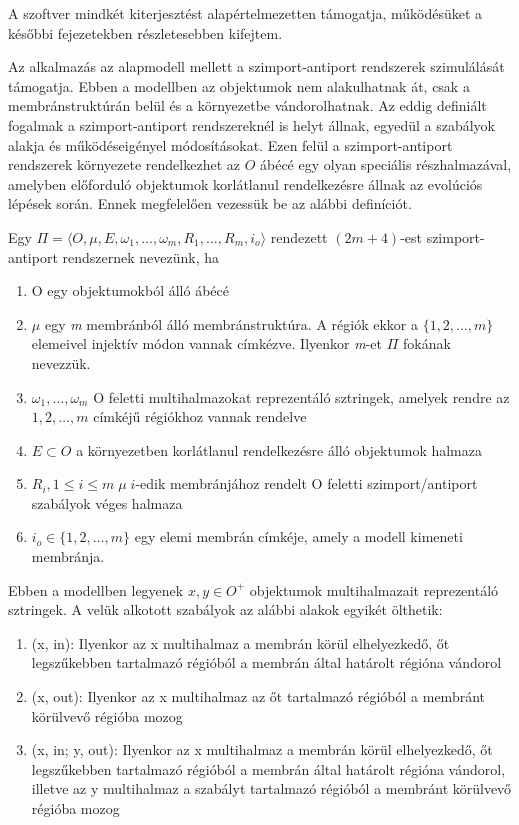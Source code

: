 A szoftver mindkét kiterjesztést alapértelmezetten támogatja, működésüket a későbbi fejezetekben részletesebben kifejtem.

Az alkalmazás az alapmodell mellett a szimport-antiport rendszerek szimulálását támogatja. 
Ebben a modellben az objektumok nem alakulhatnak át, csak a membránstruktúrán belül és a környezetbe vándorolhatnak. Az eddig definiált fogalmak a szimport-antiport rendszereknél is helyt állnak, egyedül a szabályok alakja és működéseigényel módosításokat. 
Ezen felül a szimport-antiport rendszerek környezete rendelkezhet az $O$ ábécé egy olyan speciális részhalmazával, amelyben előforduló objektumok korlátlanul rendelkezésre állnak az evolúciós lépések során.
Ennek megfelelően vezessük be az alábbi definíciót.

\begin{definition}
Egy $\Pi = \langle O, \mu , E, \omega_1 , \dots , \omega_m, R_1 , \dots , R_m , i_o  \rangle$ rendezett $(2m + 4)$-est szimport-antiport rendszernek nevezünk, ha

\begin{enumerate}
\item O egy objektumokból álló ábécé
\item $\mu$ egy \textit{m} membránból álló membránstruktúra. A régiók ekkor a $\{1,2, \dots, m\}$ elemeivel injektív módon vannak címkézve. Ilyenkor \textit{m}-et $\Pi$ fokának nevezzük.

\item  $\omega_1 , \dots , \omega_m$ O feletti multihalmazokat reprezentáló sztringek, amelyek rendre az $1, 2, \dots, m$ címkéjű régiókhoz vannak rendelve

\item $E \subset O$ a környezetben korlátlanul rendelkezésre álló objektumok halmaza

\item $R_i, 1 \leq i \leq m \; \mu \; i$-edik membránjához rendelt O feletti szimport/antiport szabályok véges halmaza

\item$ i_o \in \{1,2, \dots, m\}$ egy elemi membrán címkéje, amely a modell kimeneti membránja.
\end{enumerate}
\end{definition}

Ebben a modellben legyenek $x, y \in O^+$ objektumok multihalmazait reprezentáló sztringek. A velük alkotott szabályok az alábbi alakok egyikét ölthetik:

\begin{enumerate}
\item (x, in): Ilyenkor az x multihalmaz a membrán körül elhelyezkedő, őt legszűkebben tartalmazó régióból a membrán által határolt régióna vándorol
\item (x, out): Ilyenkor az x multihalmaz az őt tartalmazó régióból a membránt körülvevő régióba mozog
\item (x, in; y, out): Ilyenkor az x multihalmaz a membrán körül elhelyezkedő, őt legszűkebben tartalmazó régióból a membrán által határolt régióna vándorol, illetve az y multihalmaz a szabályt tartalmazó régióból a membránt körülvevő régióba mozog
\end{enumerate}

